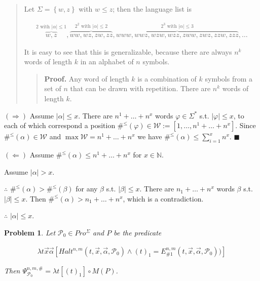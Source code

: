 \documentclass[a4paper, 12pt]{article}
\newtheorem{problem}{Problem}
\newtheorem{problem}{Problem}
\begin{document}
\small
\begin{quote}

Let $\Sigma = \left\{ w, z \right\} $ with $w \leq z$; then the
language list is 

\begin{align*}
    \overbrace{w, z}^{2 \text{ with }|\alpha| \leq 1}, \overbrace{ww, wz, zw,
        zz}^{2^2 \text{ with }|\alpha|
        \leq 2}, \overbrace{ www, wwz, wzw, wzz, zww, zwz, zzw, zzz }^{ 2^3
        \text{ with } |\alpha| \leq 3}, \ldots
\end{align*}

It is easy to see that this is generalizable, because there are always $n^k$
words of length $k$ in an alphabet of $n$ symbols. 

\small
\begin{quote}
    \textbf{Proof.} Any word of length $k$ is a combination of $k$ symbols from
    a set of $n$ that can be drawn with repetition. There are $n^k$ words of
    length $k$.
\end{quote}
\normalsize


\end{quote}
\normalsize

$(\Rightarrow)$ Assume $|\alpha| \leq x$. There are $n^1 + \ldots + n^x$ words
$\varphi \in \Sigma^{*}$ s.t. $|\varphi| \leq x$, to each of which correspond a
position $\#^{\leq}(\varphi) \in \mathscr{W} := [1, \ldots, n^1 + \ldots +
n^x]$. Since $\#^{\leq}(\alpha) \in \mathscr{W}$ and $\max \mathscr{W} = n^1 +
\ldots + n^x$ we have $\#^{\leq}(\alpha) \leq \sum_{i=1}^{x} n^x$. $\blacksquare$

$(\Leftarrow)$ Assume $\#^{\leq}(\alpha) \leq n^1 + \ldots + n^x$ for $x \in
\mathbb{N}$. 

Assume $|\alpha| > x$.  

$\therefore $ $\#^{\leq}(\alpha) >
\#^{\leq}(\beta)$ for any $\beta$ s.t. $|\beta| \leq x$. There are $n_1 + \ldots
+ n^x$ words $\beta$ s.t. $|\beta| \leq x$. Then $\#^{\leq}(\alpha) > n_1 +
\ldots + n^x$, which is a contradiction. 

$\therefore $ $|\alpha| \leq x$.

\pagebreak 

\begin{problem}

    Let $\mathcal{P}_0 \in Pro^{\Sigma}$ and $P$ be the predicate

    \begin{align*}
 \lambda t\vec{x}\vec{\alpha}[Halt^{n,m}\left( t,\vec{x},\vec{\alpha}, \mathcal{P}_{0}\right) \wedge (t)_{1}=E_{\#1}^{n,m}(t,\vec{x},\vec{\alpha}, \mathcal{P}_{0}))]
\end{align*}

Then $\Psi _{\mathcal{P}_{0}}^{n,m,\#}=\lambda t\left[ (t)_{1}\right] \circ
M(P)$.
\end{problem}
\end{document}
